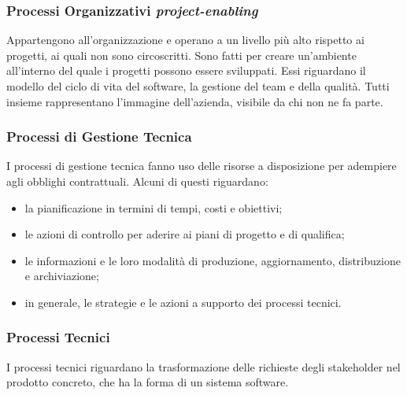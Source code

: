 		\subsubsection{Processi Organizzativi \textit{project-enabling}}
		Appartengono all'organizzazione e operano a un livello più alto rispetto ai progetti, ai quali non sono circoscritti. Sono fatti per creare un'ambiente all'interno del quale i progetti possono essere sviluppati. Essi riguardano il modello del ciclo di vita del software, la gestione del team e della qualità. Tutti insieme rappresentano l'immagine dell'azienda, visibile da chi non ne fa parte.
		\subsubsection{Processi di Gestione Tecnica}
		I processi di gestione tecnica fanno uso delle risorse a disposizione per adempiere agli obblighi contrattuali. Alcuni di questi riguardano:
		\begin{itemize}
			\item la pianificazione in termini di tempi, costi e obiettivi;
			\item le azioni di controllo per aderire ai piani di progetto e di qualifica;
			\item le informazioni e le loro modalità di produzione, aggiornamento, distribuzione e archiviazione;
			\item in generale, le strategie e le azioni a supporto dei processi tecnici.
		\end{itemize}
		
		\subsubsection{Processi Tecnici}
		I processi tecnici riguardano la trasformazione delle richieste degli stakeholder nel prodotto concreto, che ha la forma di un sistema software.
			
	
	\pagebreak
